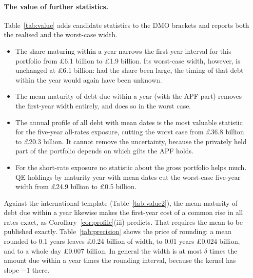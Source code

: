 \documentclass[11pt,a4paper]{article}
\theoremstyle{remark}
\begin{document}
\paragraph{The value of further statistics.} Table~\ref{tab:value} adds candidate statistics to the DMO brackets and reports both the realised and the worst-case width.
\begin{itemize}
\item The share maturing within a year narrows the first-year interval for this portfolio from £6.1 billion to £1.9 billion. Its worst-case width, however, is unchanged at £6.1 billion: had the share been large, the timing of that debt within the year would again have been unknown.
\item The mean maturity of debt due within a year (with the APF part) removes the first-year width entirely, and does so in the worst case.
\item The annual profile of all debt with mean dates is the most valuable statistic for the five-year all-rates exposure, cutting the worst case from £36.8 billion to £20.3 billion. It cannot remove the uncertainty, because the privately held part of the portfolio depends on which gilts the APF holds.
\item For the short-rate exposure no statistic about the gross portfolio helps much. QE holdings by maturity year with mean dates cut the worst-case five-year width from £24.9 billion to £0.5 billion.
\end{itemize}
Against the international template (Table~\ref{tab:value2}), the mean maturity of debt due within a year likewise makes the first-year cost of a common rise in all rates exact, as Corollary~\ref{cor:profile}(iii) predicts. That requires the mean to be published exactly. Table~\ref{tab:precision} shows the price of rounding: a mean rounded to 0.1 years leaves £0.24 billion of width, to 0.01 years £0.024 billion, and to a whole day £0.007 billion. In general the width is at most $\delta$ times the amount due within a year times the rounding interval, because the kernel has slope $-1$ there.

\begin{table}[t]\centering\small
\caption{Width of the identified interval, £ billion, when a specified reporting package is added to the DMO brackets (consolidated perimeter). ``Realised'' uses the statistic's actual value; ``worst case'' is the largest width over all values it could take (Proposition~\ref{prop:coupled}).}\label{tab:value}
\resizebox{\textwidth}{!}{}
\end{table}
\end{document}
